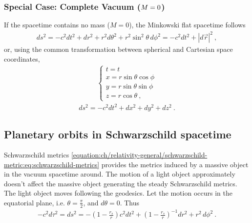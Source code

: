 \documentclass[letterpaper,10pt,english]{jupyterBook}
\begin{document}
\subsubsection{Special Case: Complete Vacuum (\protect\(M = 0\protect\))}
\label{\detokenize{ch/relativity-general/schwarzschild-metric:special-case-complete-vacuum-m-0}}
\sphinxAtStartPar
If the spacetime contains no mass (\(M = 0\)), the Minkowski flat spacetime follows
\begin{equation*}
\begin{split}ds^2 = -c^2 dt^2 + d r^2 + r^2 d \theta^2 + r^2 \sin^2 \theta \, d\phi^2 = - c^2 dt^2 + |d \vec{r}|^2 \ , \end{split}
\end{equation*}
\sphinxAtStartPar
or, using the common transformation between spherical and Cartesian space coordinates,
\begin{equation*}
\begin{split}\begin{cases}
  t = t \\
  x = r \sin \theta \cos \phi \\
  y = r \sin \theta \sin \phi \\
  z = r \cos \theta \ ,
\end{cases}\end{split}
\end{equation*}\begin{equation*}
\begin{split}ds^2 = - c^2 dt^2 + dx^2 + dy^2 + dz^2 \ .\end{split}
\end{equation*}
\sphinxstepscope


\subsection{Planetary orbits in Schwarzschild spacetime}
\label{\detokenize{ch/relativity-general/schwarzschild-orbits:planetary-orbits-in-schwarzschild-spacetime}}\label{\detokenize{ch/relativity-general/schwarzschild-orbits:relativity-general-notes-examples-schwarzschild-orbits}}\label{\detokenize{ch/relativity-general/schwarzschild-orbits::doc}}
\sphinxAtStartPar
Schwarzschild metrics \eqref{equation:ch/relativity-general/schwarzschild-metric:eq:schwarzschild-metrics} provides the metrics induced by a massive object in the vacuum spacetime around. The motion of a light object approximately doesn’t affect the massive object generating the steady Schwarzschild metrics. The light object moves following the geodesics.
Let the motion occurs in the equatorial plane, i.e. \(\theta = \frac{\pi}{2}\), and \(d \theta = 0\). Thus
\begin{equation*}
\begin{split}
- c^2 d \tau^2 = ds^2 =
- \left(1 - \frac{r_s}{r} \right) c^2 dt^2 + 
  \left(1 - \frac{r_s}{r} \right)^{-1} dr^2 + r^2 \, d\phi^2 \ .
\end{split}
\end{equation*}
\end{document}
